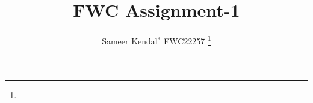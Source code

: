 \documentclass[journal,12pt,twocolumn]{IEEEtran}
\theoremstyle{remark}
\begin{document}



\vspace{3cm}

\title{
FWC Assignment-1
}
\author{ Sameer Kendal$^{*}$ FWC22257%
	\thanks{}
	
}


%
%
%

% 
%



% 
\end{document}
